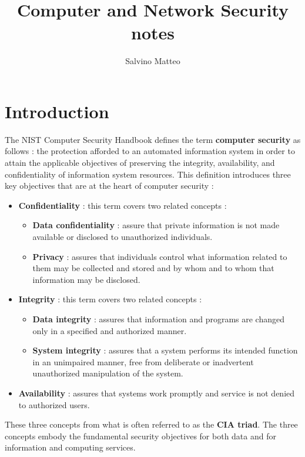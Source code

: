 \documentclass[11pt]{article}
\title{Computer and Network Security notes}
\author{Salvino Matteo}
\date{}
\begin{document}
\maketitle
\pagebreak
\tableofcontents
\pagebreak
\section{Introduction}
The NIST Computer Security Handbook defines the term \textbf{computer security} as follows : the protection afforded to an automated information system in order to attain the applicable objectives of preserving the integrity, availability, and confidentiality of information system resources. This definition introduces three key objectives that are at the heart of computer security :
\begin{itemize}
\item \textbf{Confidentiality} : this term covers two related concepts :
\begin{itemize}
\item \textbf{Data confidentiality} : assure that private information is not made available or disclosed to unauthorized individuals.
\item \textbf{Privacy} : assures that individuals control what information related to them may be collected and stored and by whom and to whom that information may be disclosed.
\end{itemize}
\item \textbf{Integrity} : this term covers two related concepts : 
\begin{itemize}
\item \textbf{Data integrity} : assures that information and programs are changed only in a specified and authorized manner.
\item \textbf{System integrity} : assures that a system performs its intended function in an unimpaired manner, free from deliberate or inadvertent unauthorized manipulation of the system.
\end{itemize}
\item \textbf{Availability} : assures that systems work promptly and service is not denied to authorized users.
\end{itemize}
These three concepts from what is often referred to as the \textbf{CIA triad}. The three concepts embody the fundamental security objectives for both data and for information and computing services.
\end{document}
